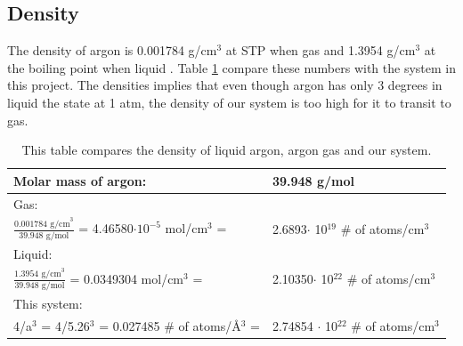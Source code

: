 \subsection{Density}

The density of argon is 0.001784 g/cm$^3$ at STP when gas and 1.3954 g/cm$^3$ at the boiling point when liquid \cite{argon}. Table \ref{tab:density} compare these numbers with the system in this project. The densities implies that even though argon has only 3 degrees in liquid the state at 1 atm, the density of our system is too high for it to transit to gas. 

\begin{table}\caption{This table compares the density of liquid argon, argon gas and our system.}\label{tab:density}
\begin{tabular}{ll}
Molar mass of argon:& 39.948 g/mol\\ \hline
Gas:& \\
$\frac{0.001784 \text{ g/cm}^3 }{39.948 \text{ g/mol}}$ = 4.46580$\cdot 10^{-5}$ mol/cm$^3$ = & 2.6893$\cdot$ 10$^{19}$ \# of atoms/cm$^3$\\
Liquid:&\\
$\frac{1.3954 \text{ g/cm}^3 }{39.948 \text{ g/mol}}$ = 0.0349304 mol/cm$^3$ =& 2.10350$\cdot$ 10$^{22}$ \# of atoms/cm$^3$\\
This system:& \\
 4/a$^3$ = 4/5.26$^3$ = 0.027485 \# of atoms/Å$^3$ =& 2.74854 $\cdot$ 10$^{22}$ \# of atoms/cm$^3$\\
\end{tabular}
\end{table}
